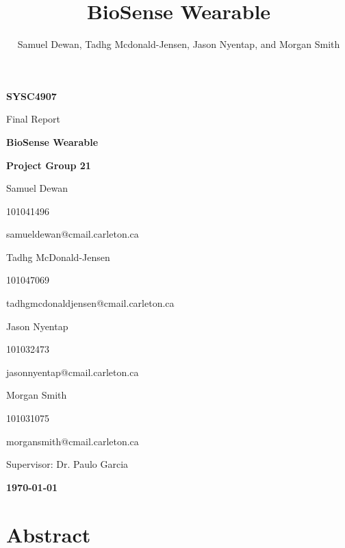 \documentclass[11pt,letterpaper]{article}
\title{BioSense Wearable}
\author{Samuel Dewan, Tadhg Mcdonald-Jensen, Jason Nyentap, and Morgan Smith}
\begin{document}
\frenchspacing

\begin{titlepage}
\centering

{\large \textbf{SYSC4907}}

{\Huge \sffamily Final Report}

{\large \textbf{BioSense Wearable}}

\textbf{Project Group 21}

Samuel Dewan

{\footnotesize 101041496}

{\footnotesize samueldewan@cmail.carleton.ca}

Tadhg McDonald-Jensen

{\footnotesize 101047069}

{\footnotesize tadhgmcdonaldjensen@cmail.carleton.ca}

Jason Nyentap

{\footnotesize 101032473}

{\footnotesize jasonnyentap@cmail.carleton.ca}

Morgan Smith

{\footnotesize 101031075}

{\footnotesize morgansmith@cmail.carleton.ca}

Supervisor: Dr. Paulo Garcia


{\large \textbf{\today}}


\end{titlepage}


\section*{Abstract}
\label{sec:abstract}

\clearpage

\tableofcontents
\clearpage

\listoffigures
\clearpage
\end{document}
